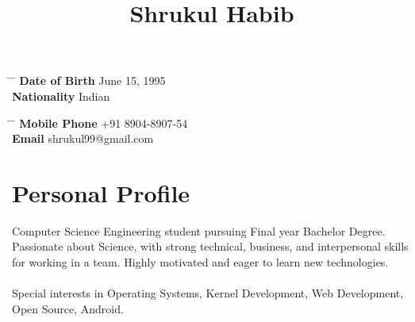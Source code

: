 \documentclass[10pt]{article} %
\begin{document}

\title{Shrukul Habib} %


\parbox{0.5\textwidth}{ %
\begin{tabbing} %
\hspace{3cm} \= \hspace{4cm} \= \kill %
{\bf Date of Birth} \> June 15, 1995 \\ %
{\bf Nationality} \> Indian %
\end{tabbing}}
\hfill %
\parbox{0.5\textwidth}{ %
\begin{tabbing} %
\hspace{3cm} \= \hspace{4cm} \= \kill %
{\bf Mobile Phone} \> +91 8904-8907-54 \\ %
{\bf Email} \> {shrukul99@gmail.com} \\ %
\end{tabbing}}


\section{Personal Profile}

Computer Science Engineering student pursuing Final year Bachelor Degree. \\
Passionate about Science, with strong technical, business, and interpersonal skills for working 
in a team. Highly motivated and eager to learn new technologies. \\
\\
Special interests in Operating Systems, Kernel Development, Web Development,
Open Source, Android.

\end{document}
